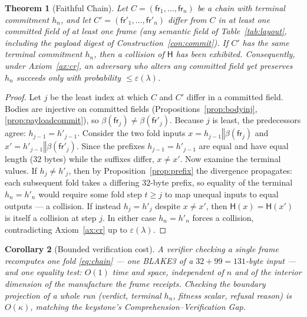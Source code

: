 \documentclass[11pt,oneside]{book}
\theoremstyle{definition}
\theoremstyle{plain}
\newtheorem{theorem}{Theorem}[chapter]
\newtheorem{corollary}[theorem]{Corollary}
\theoremstyle{remark}
\newcommand{\chainH}{\mathsf{H}}               %
\newcommand{\CL}{\kappa}                       %
\newcommand{\fr}{\mathsf{fr}}                   %
\newcommand{\body}{\beta}                       %
\newcommand{\concat}{\mathbin{\Vert}}           %
\newcommand{\Ledger}{C}               %
\begin{document}
\begin{theorem}[Faithful Chain]\label{thm:faithful}
Let $\Ledger=(\fr_1,\dots,\fr_n)$ be a chain with terminal commitment $h_n$, and let
$\Ledger'=(\fr'_1,\dots,\fr'_n)$ differ from $\Ledger$ in at least one committed field of at
least one frame (any semantic field of Table~\ref{tab:layout}, including the payload digest of
Construction~\ref{con:commit}). %
If $\Ledger'$ has the \emph{same} terminal commitment $h_n$,
then a collision of $\chainH$ has been exhibited. %
Consequently, under Axiom~\ref{ax:cr}, an
adversary who alters any committed field yet preserves $h_n$ succeeds only with probability
$\le \varepsilon(\lambda)$. %
\end{theorem}

\begin{proof}
Let $j$ be the least index at which $\Ledger$ and $\Ledger'$ differ in a committed field. %
Bodies are injective on committed fields (Propositions~\ref{prop:bodyinj},
\ref{prop:payloadcommit}), so $\body(\fr_j)\ne\body(\fr'_j)$. %
Because $j$ is least, the
predecessors agree: $h_{j-1}=h'_{j-1}$. %
Consider the two fold inputs
$x=h_{j-1}\concat\body(\fr_j)$ and $x'=h'_{j-1}\concat\body(\fr'_j)$. %
Since the prefixes
$h_{j-1}=h'_{j-1}$ are equal and have equal length ($32$ bytes) while the suffixes differ,
$x\ne x'$. %
Now examine the terminal values. %
If $h_j\ne h'_j$, then by
Proposition~\ref{prop:prefix} the divergence propagates: each subsequent fold takes a differing
$32$-byte prefix, so equality of the terminal $h_n=h'_n$ would require some fold step
$t\ge j$ to map unequal inputs to equal outputs --- a collision. %
If instead $h_j=h'_j$ despite
$x\ne x'$, then $\chainH(x)=\chainH(x')$ is itself a collision at step $j$. %
In either case
$h_n=h'_n$ forces a collision, contradicting Axiom~\ref{ax:cr} up to $\varepsilon(\lambda)$. %
\end{proof}

\begin{corollary}[Bounded verification cost]\label{cor:cost}
A verifier checking a single frame recomputes one fold \eqref{eq:chain} --- one BLAKE3 of a
$32+99=131$-byte input --- and one equality test: $O(1)$ time and space, independent of $n$
and of the interior dimension of the manufacture the frame receipts. %
Checking the boundary
projection of a whole run (verdict, terminal $h_n$, fitness scalar, refusal reason) is
$O(\CL)$, matching the keystone's Comprehension--Verification Gap. %
\end{corollary}
\end{document}
